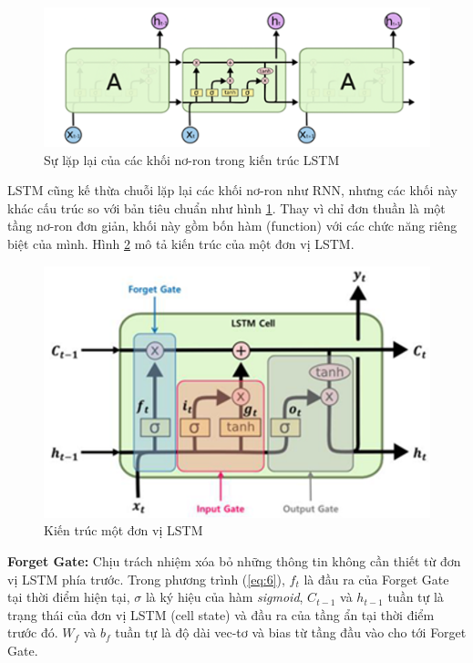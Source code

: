 \begin{figure}[H]
    \centering
    \includegraphics[scale=0.75]{./content/images/2-8.png}
    \caption{Sự lặp lại của các khối nơ-ron trong kiến trúc LSTM}
    \label{fig:2-8}
\end{figure}

LSTM cũng kế thừa chuỗi lặp lại các khối nơ-ron như RNN, nhưng các khối này khác cấu trúc so với bản tiêu chuẩn như hình \ref{fig:2-8}. Thay vì chỉ đơn thuần là một tầng nơ-ron đơn giản, khối này gồm bốn hàm (function) với các chức năng riêng biệt của mình. Hình \ref{fig:2-9} mô tả kiến trúc của một đơn vị LSTM.

\begin{figure}[H]
    \centering
    \includegraphics[scale=0.75]{./content/images/2-9.png}
    \caption{Kiến trúc một đơn vị LSTM}
    \label{fig:2-9}
\end{figure}

\textbf{Forget Gate: } Chịu trách nhiệm xóa bỏ những thông tin không cần thiết từ đơn vị LSTM phía trước. Trong phương trình (\ref{eq:6}), $f_t$ là đầu ra của Forget Gate tại thời điểm hiện tại,  $\sigma$ là ký hiệu của hàm \textit{sigmoid}, $C_{t-1}$ và $h_{t-1}$ tuần tự là trạng thái của đơn vị LSTM (cell state) và đầu ra của tầng ẩn tại thời điểm trước đó. $W_f$ và $b_f$ tuần tự là độ dài vec-tơ và bias từ tầng đầu vào cho tới Forget Gate.


